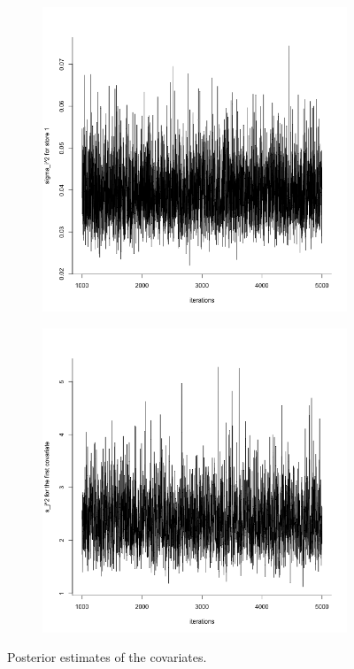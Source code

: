 \documentclass[11pt]{article}
\begin{document}
\begin{figure}
    \vspace{1cm}
    \centering
    \begin{subfigure}[t]{0.5\textwidth}
        \centering
        \includegraphics[width=\linewidth]{Ex5/figures/tra_sig2.png} 
    \end{subfigure}
    \hfill
    \begin{subfigure}[t]{0.5\textwidth}
        \centering
        \includegraphics[width=\linewidth]{Ex5/figures/tra_s2.png} 
    \end{subfigure}
    \caption{Posterior estimates of the covariates.}
\end{figure}
\end{document}
